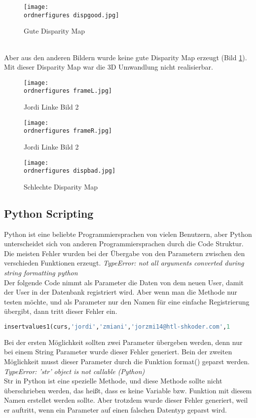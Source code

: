 \begin{figure}[!htb]
  \centering
    \texttt{[image: \\ordnerfigures dispgood.jpg]}
      \caption{Gute Disparity Map}
\end{figure}\\
Aber aus den anderen Bildern wurde keine gute Disparity Map erzeugt (Bild \ref{fig:baddm}). Mit dieser Disparity Map war die 3D Umwandlung nicht realisierbar.
\begin{figure}[!htb]
   \begin{minipage}{0.48\textwidth}
     \centering
     \texttt{[image: \\ordnerfigures frameL.jpg]}
     \caption{Jordi Linke Bild 2}
   \end{minipage}\hfill
   \begin{minipage}{0.48\textwidth}
     \centering
     \texttt{[image: \\ordnerfigures frameR.jpg]}
     \caption{Jordi Linke Bild 2}
   \end{minipage}
\end{figure}
\begin{figure}[!htb]
  \centering
    \texttt{[image: \\ordnerfigures dispbad.jpg]}
      \caption{Schlechte Disparity Map}
      \label{fig:baddm}
\end{figure}
\newpage
\subsection{Python Scripting}
Python ist eine beliebte Programmiersprachen von vielen Benutzern, aber Python unterscheidet sich von anderen Programmiersprachen durch die Code Struktur. Die meisten Fehler wurden bei der Übergabe von den Parametern zwischen den verschieden Funktionen erzeugt.
\bigbreak
\textit{TypeError: not all arguments converted during string formatting python}\\
Der folgende Code nimmt als Parameter die Daten von dem neuen User, damit der User in der Datenbank registriert wird. Aber wenn man die Methode nur testen möchte, und als Parameter nur den Namen für eine einfache Registrierung übergibt, dann tritt dieser Fehler ein. \\
\begin{lstlisting}[language=Python]
insertvalues1(curs,'jordi','zmiani','jorzmi14@htl-shkoder.com',1
\end{lstlisting}
Bei der ersten Möglichkeit sollten zwei Parameter übergeben werden, denn nur bei einem String Parameter wurde dieser Fehler generiert.
Bein der zweiten Möglichkeit musst dieser Parameter durch die Funktion format()  geparst werden.
\bigbreak
\textit{TypeError: 'str' object is not callable (Python)}\\
Str in Python ist eine spezielle Methode, und diese Methode sollte nicht überschrieben werden, das heißt, dass es keine Variable bzw. Funktion mit diesem Namen erstellet werden  sollte. Aber trotzdem wurde dieser Fehler generiert, weil er auftritt, wenn ein Parameter auf einen falschen Datentyp geparst wird.

